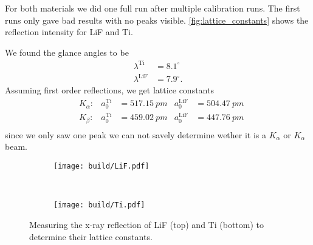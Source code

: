 For both materials we did one full run after multiple calibration runs. The first runs only gave bad
results with no peaks visible. \autoref{fig:lattice_constants} shows the reflection intensity for
LiF and Ti.

We found the glance angles to be
\begin{align}
  \lambda^\text{Ti} &= 8.1^\circ \\
  \lambda^\text{LiF} &= 7.9^\circ.
\end{align}
Assuming first order reflections, we get lattice constants
\begin{align}
  &K_\alpha: & a_0^\text{Ti} &= \SI{517.15}{pm} & a_0^\text{LiF} &= \SI{504.47}{pm} \\
  &K_\beta: & a_0^\text{Ti} &= \SI{459.02}{pm} & a_0^\text{LiF} &= \SI{447.76}{pm} \\
\end{align}
since we only saw one peak we can not savely determine wether it is a $K_\alpha$ or $K_\alpha$ beam.

\begin{figure}
  \centering
  \begin{subfigure}[b]{0.45\textwidth}
    \centering
    \texttt{[image: build/LiF.pdf]}
    \label{fig:lif}
  \end{subfigure}
  \\
  \begin{subfigure}[b]{0.45\textwidth}
    \centering
    \texttt{[image: build/Ti.pdf]}
    \label{fig:ti}
  \end{subfigure}
  \caption{Measuring the x-ray reflection of LiF (top) and Ti (bottom) to
  determine their lattice constants.}
  \label{fig:lattice_constants}
\end{figure}
